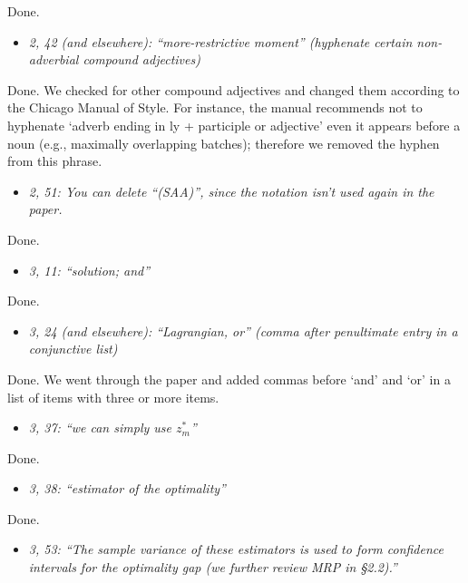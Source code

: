 \documentclass[11pt,notitlepage,onecolumn]{article}
\newcommand{\noi}{\noindent}
\begin{document}
\noi
Done.  
\medskip 


\begin{itemize}
\item[] \textit{2, 42 (and elsewhere): ``more-restrictive moment'' (hyphenate certain non-adverbial compound adjectives)}
\end{itemize}

\noi
Done.  
We checked for other compound adjectives and changed them according to the Chicago Manual of Style. 
For instance, the manual recommends not to hyphenate `adverb ending in ly + participle or adjective' even it appears before a noun (e.g., maximally overlapping batches); therefore we removed the hyphen from this phrase. 
\medskip 


\begin{itemize}
\item[] \textit{2, 51: You can delete ``(SAA)'', since the notation isn't used again in the paper.}
\end{itemize}

\noi
Done.  
\medskip 


\begin{itemize}
\item[] \textit{3, 11: ``solution; and''}
\end{itemize}

\noi
Done.
\medskip 


\begin{itemize}
\item[] \textit{3, 24 (and elsewhere): ``Lagrangian, or'' (comma after penultimate entry in a conjunctive list)}
\end{itemize}

\noi
Done.  
We went through the paper and added commas before `and' and `or' in a list of items with three or more items.
\medskip 


\begin{itemize}
\item[] \textit{3, 37: ``we can simply use $z_m^*$''}
\end{itemize}

\noi
Done. 
\medskip 


\begin{itemize}
\item[] \textit{3, 38: ``estimator of the optimality''}
\end{itemize}

\noi
Done.  
\medskip 


\begin{itemize}
\item[] \textit{3, 53: ``The sample variance of these estimators is used to form confidence intervals for the optimality gap (we further review MRP in \S 2.2).''}
\end{itemize}
\end{document}
